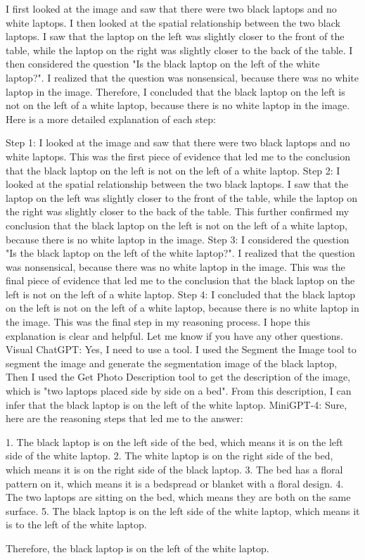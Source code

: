 \begin{enumerate}
        I first looked at the image and saw that there were two black laptops and no white laptops.
        I then looked at the spatial relationship between the two black laptops. I saw that the laptop on the left was slightly closer to the front of the table, while the laptop on the right was slightly closer to the back of the table.
        I then considered the question "Is the black laptop on the left of the white laptop?". I realized that the question was nonsensical, because there was no white laptop in the image.
        Therefore, I concluded that the black laptop on the left is not on the left of a white laptop, because there is no white laptop in the image.
        Here is a more detailed explanation of each step:

        Step 1: I looked at the image and saw that there were two black laptops and no white laptops. This was the first piece of evidence that led me to the conclusion that the black laptop on the left is not on the left of a white laptop.
        Step 2: I looked at the spatial relationship between the two black laptops. I saw that the laptop on the left was slightly closer to the front of the table, while the laptop on the right was slightly closer to the back of the table. This further confirmed my conclusion that the black laptop on the left is not on the left of a white laptop, because there is no white laptop in the image.
        Step 3: I considered the question "Is the black laptop on the left of the white laptop?". I realized that the question was nonsensical, because there was no white laptop in the image. This was the final piece of evidence that led me to the conclusion that the black laptop on the left is not on the left of a white laptop.
        Step 4: I concluded that the black laptop on the left is not on the left of a white laptop, because there is no white laptop in the image. This was the final step in my reasoning process.
        I hope this explanation is clear and helpful. Let me know if you have any other questions.
        \subitem Visual ChatGPT: Yes, I need to use a tool. I used the Segment the Image tool to segment the image and generate the segmentation image of the black laptop, Then I used the Get Photo Description tool to get the description of the image, which is "two laptops placed side by side on a bed". From this description, I can infer that the black laptop is on the left of the white laptop.
        \subitem MiniGPT-4: Sure, here are the reasoning steps that led me to the answer:

        1. The black laptop is on the left side of the bed, which means it is on the left side of the white laptop.
        2. The white laptop is on the right side of the bed, which means it is on the right side of the black laptop.
        3. The bed has a floral pattern on it, which means it is a bedspread or blanket with a floral design.
        4. The two laptops are sitting on the bed, which means they are both on the same surface.
        5. The black laptop is on the left side of the white laptop, which means it is to the left of the white laptop.
        
        Therefore, the black laptop is on the left of the white laptop.
    \end{enumerate}
